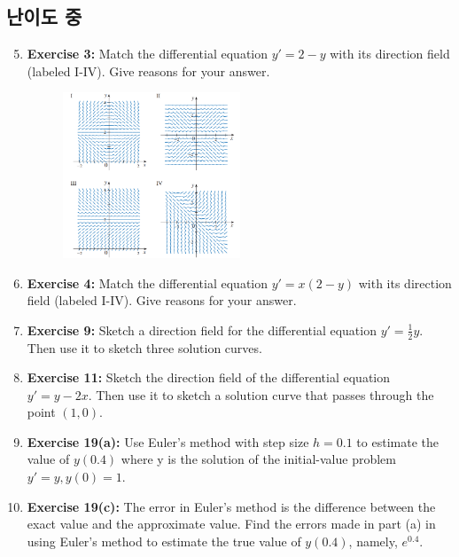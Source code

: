 \documentclass[12pt, a4paper]{article}
\begin{document}
\subsection*{난이도 중 }
\begin{enumerate}
    \setcounter{enumi}{4} %
    \item \textbf{Exercise 3:} Match the differential equation $y' = 2 - y$ with its direction field (labeled I-IV). Give reasons for your answer.
    
     \begin{figure}[htbp]
        \centering
        \includegraphics[width=0.5\textwidth]{graph2.png} %
    \end{figure}


    \item \textbf{Exercise 4:} Match the differential equation $y' = x(2 - y)$ with its direction field (labeled I-IV). Give reasons for your answer.

    \item \textbf{Exercise 9:} Sketch a direction field for the differential equation $y' = \frac{1}{2}y$. Then use it to sketch three solution curves.

    \item \textbf{Exercise 11:} Sketch the direction field of the differential equation $y' = y - 2x$. Then use it to sketch a solution curve that passes through the point $(1,0)$.

    \item \textbf{Exercise 19(a):} Use Euler's method with step size $h=0.1$ to estimate the value of $y(0.4)$ where y is the solution of the initial-value problem $y' = y, y(0)=1$.

    \item \textbf{Exercise 19(c):} The error in Euler's method is the difference between the exact value and the approximate value. Find the errors made in part (a) in using Euler's method to estimate the true value of $y(0.4)$, namely, $e^{0.4}$.


\end{enumerate}
\end{document}
